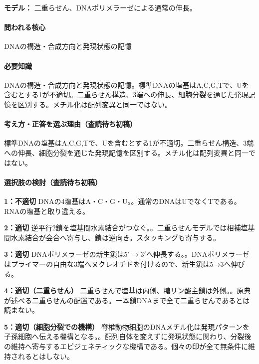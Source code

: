 \noindent\textbf{モデル：} 二重らせん、DNAポリメラーゼによる通常の伸長。\par

\paragraph{問われる核心} DNAの構造・合成方向と発現状態の記憶

\paragraph{必要知識} DNAの構造・合成方向と発現状態の記憶。標準DNAの塩基はA,C,G,Tで、Uを含むとする1が不適切。二重らせん構造、3端への伸長、細胞分裂を通じた発現記憶を区別する。メチル化は配列変異と同一ではない。

\paragraph{考え方・正答を選ぶ理由（査読待ち初稿）} 標準DNAの塩基はA,C,G,Tで、Uを含むとする1が不適切。二重らせん構造、3端への伸長、細胞分裂を通じた発現記憶を区別する。メチル化は配列変異と同一ではない。

\paragraph{選択肢の検討（査読待ち初稿）}\mbox{}\par

\noindent\textbf{1：不適切} DNAの4塩基はA・C・G・U。。通常のDNAはUでなくTである。RNAの塩基と取り違える。\par

\noindent\textbf{2：適切} 逆平行2鎖を塩基間水素結合がつなぐ。。二重らせんモデルでは相補塩基間水素結合が会合へ寄与し、鎖は逆向き。スタッキングも寄与する。\par

\noindent\textbf{3：適切} DNAポリメラーゼの新生鎖は\(5'\to3'\)へ伸長する。。DNAポリメラーゼはプライマーの自由な3端へヌクレオチドを付けるので、新生鎖は5→3へ伸びる。\par

\noindent\textbf{4：適切（二重らせん）} 二重らせんで塩基は内側、糖リン酸主鎖は外側。。原典が述べる二重らせんの配置である。一本鎖DNAまで全て二重らせんであるとは読まない。\par

\noindent\textbf{5：適切（細胞分裂での機構）} 脊椎動物細胞のDNAメチル化は発現パターンを子孫細胞へ伝える機構となる。。配列自体を変えずに発現状態に関わり、分裂後の維持へ寄与するエピジェネティックな機構である。個々の印が全て無条件に維持されるとはしない。\par

